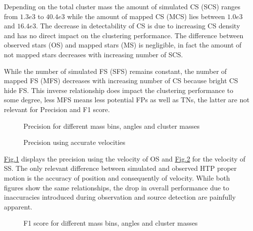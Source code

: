 \documentclass[letterpaper,10pt,english]{sphinxmanual}
\begin{document}
\sphinxAtStartPar
Depending on the total cluster mass the amount of simulated CS (SCS) ranges from \(1.3e3\) to \(40.4e3\) while the amount of mapped CS (MCS) lies between \(1.0e3\) and \(16.4e3\).
The decrease in detectability of CS is due to increasing CS density and has no direct impact on the clustering performance.
The difference between observed stars (OS) and mapped stars (MS) is negligible, in fact the amount of not mapped stars decreases with increasing number of SCS.

\sphinxAtStartPar
While the number of simulated FS (SFS) remains constant, the number of mapped FS (MFS) decreases with increasing number of CS because bright CS hide FS.
This inverse relationship does impact the clustering performance to some degree, less MFS means less potential FPs as well as TNs, the latter are not relevant for Precision and F1 score.

\begin{figure}[htbp]
\centering
\capstart

\noindent{}
\caption{Precision for different mass bins, angles and cluster masses}\label{\detokenize{NBodySimulation/Experiments:id4}}\label{\detokenize{NBodySimulation/Experiments:fig-25-precision}}\end{figure}

\begin{figure}[htbp]
\centering
\capstart

\noindent{}
\caption{Precision using accurate velocities}\label{\detokenize{NBodySimulation/Experiments:id5}}\label{\detokenize{NBodySimulation/Experiments:fig-25-precision-sim}}\end{figure}

\sphinxAtStartPar
\hyperref[\detokenize{NBodySimulation/Experiments:fig-25-precision}]{Fig.\@ \ref{\detokenize{NBodySimulation/Experiments:fig-25-precision}}} displays the precision using the velocity of OS and \hyperref[\detokenize{NBodySimulation/Experiments:fig-25-precision-sim}]{Fig.\@ \ref{\detokenize{NBodySimulation/Experiments:fig-25-precision-sim}}} for the velocity of SS.
The only relevant difference between simulated and observed HTP proper motion is the accuracy of position and consequently of velocity.
While both figures show the same relationships, the drop in overall performance due to inaccuracies introduced during observation and source detection are painfully apparent.

\begin{figure}[htbp]
\centering
\capstart

\noindent{}
\caption{F1 score for different mass bins, angles and cluster masses}\label{\detokenize{NBodySimulation/Experiments:id6}}\label{\detokenize{NBodySimulation/Experiments:fig-25-f1}}\end{figure}
\end{document}
